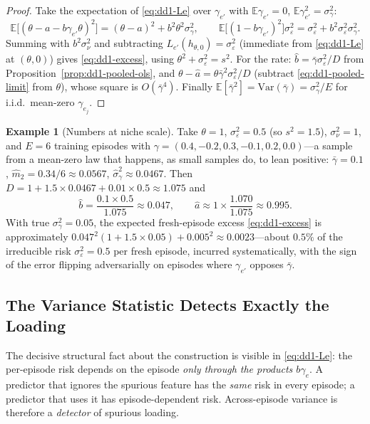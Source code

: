 \documentclass[11pt,a4paper]{article}
\theoremstyle{definition}
\newtheorem{example}{Example}[section]
\theoremstyle{plain}
\newcommand{\E}{\mathbb{E}}
\newcommand{\Var}{\mathrm{Var}}
\begin{document}
\begin{proof}
Take the expectation of \eqref{eq:dd1-Le} over $\gamma_{e'}$ with
$\E\gamma_{e'} = 0$, $\E\gamma_{e'}^2 = \sigma_\gamma^2$:
\[
\E\bigl[(\theta - a - b\gamma_{e'}\theta)^2\bigr]
= (\theta - a)^2 + b^2\theta^2\sigma_\gamma^2,
\qquad
\E\bigl[(1 - b\gamma_{e'})^2\bigr]\sigma_\varepsilon^2
= \sigma_\varepsilon^2 + b^2 \sigma_\varepsilon^2 \sigma_\gamma^2 .
\]
Summing with $b^2\sigma_\nu^2$ and subtracting
$L_{e'}(h_{\theta,0}) = \sigma_\varepsilon^2$ (immediate from
\eqref{eq:dd1-Le} at $(\theta, 0)$) gives \eqref{eq:dd1-excess}, using
$\theta^2 + \sigma_\varepsilon^2 = s^2$. For the rate: $\widehat b =
\bar\gamma \sigma_\varepsilon^2 / D$ from
Proposition~\ref{prop:dd1-pooled-ols}, and $\theta - \widehat a =
\theta \bar\gamma^2 \sigma_\varepsilon^2 / D$ (subtract
\eqref{eq:dd1-pooled-limit} from $\theta$), whose square is $O(\bar\gamma^4)$.
Finally $\E[\bar\gamma^2] = \Var(\bar\gamma) = \sigma_\gamma^2 / E$ for
i.i.d.\ mean-zero $\gamma_{e_j}$.
\end{proof}

\begin{example}[Numbers at niche scale]
\label{ex:dd1-pooled-numbers}
Take $\theta = 1$, $\sigma_\varepsilon^2 = 0.5$ (so $s^2 = 1.5$),
$\sigma_\nu^2 = 1$, and $E = 6$ training episodes with
$\gamma = (0.4, -0.2, 0.3, -0.1, 0.2, 0.0)$---a sample from a mean-zero law
that happens, as small samples do, to lean positive: $\bar\gamma = 0.1$,
$\widehat{m}_2 = 0.34/6 \approx 0.0567$, $\widehat\sigma_\gamma^2 \approx
0.0467$. Then $D = 1 + 1.5 \times 0.0467 + 0.01 \times 0.5 \approx 1.075$ and
\[
\widehat{b} = \frac{0.1 \times 0.5}{1.075} \approx 0.047, \qquad
\widehat{a} \approx 1 \times \frac{1.070}{1.075} \approx 0.995 .
\]
With true $\sigma_\gamma^2 = 0.05$, the expected fresh-episode excess
\eqref{eq:dd1-excess} is approximately $0.047^2 (1 + 1.5 \times 0.05) +
0.005^2 \approx 0.0023$---about $0.5\%$ of the irreducible risk
$\sigma_\varepsilon^2 = 0.5$ per fresh episode, incurred systematically, with
the sign of the error flipping adversarially on episodes where
$\gamma_{e'}$ opposes $\bar\gamma$.
\end{example}

\subsection{The Variance Statistic Detects Exactly the Loading}

The decisive structural fact about the construction is visible in
\eqref{eq:dd1-Le}: the per-episode risk depends on the episode \emph{only
through the products $b\gamma_e$}. A predictor that ignores the spurious
feature has the \emph{same} risk in every episode; a predictor that uses it
has episode-dependent risk. Across-episode variance is therefore a
\emph{detector} of spurious loading.
\end{document}

